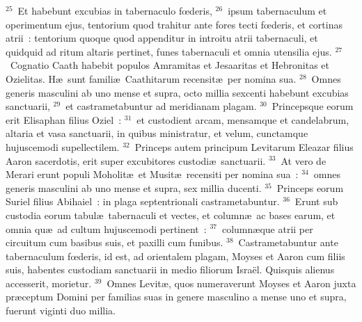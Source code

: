 ${}^{25}$~Et habebunt excubias in tabernaculo fœderis,
${}^{26}$~ipsum tabernaculum et operimentum ejus, tentorium quod trahitur ante fores tecti fœderis, et cortinas atrii~: tentorium quoque quod appenditur in introitu atrii tabernaculi, et quidquid ad ritum altaris pertinet, funes tabernaculi et omnia utensilia ejus.
${}^{27}$~Cognatio Caath habebit populos Amramitas et Jesaaritas et Hebronitas et Ozielitas. H\ae\ sunt famili\ae\ Caathitarum recensit\ae\ per nomina sua.
${}^{28}$~Omnes generis masculini ab uno mense et supra, octo millia sexcenti habebunt excubias sanctuarii,
${}^{29}$~et castrametabuntur ad meridianam plagam.
${}^{30}$~Princepsque eorum erit Elisaphan filius Oziel~:
${}^{31}$~et custodient arcam, mensamque et candelabrum, altaria et vasa sanctuarii, in quibus ministratur, et velum, cunctamque hujuscemodi supellectilem.
${}^{32}$~Princeps autem principum Levitarum Eleazar filius Aaron sacerdotis, erit super excubitores custodi\ae\ sanctuarii.
${}^{33}$~At vero de Merari erunt populi Moholit\ae\ et Musit\ae\ recensiti per nomina sua~:
${}^{34}$~omnes generis masculini ab uno mense et supra, sex millia ducenti.
${}^{35}$~Princeps eorum Suriel filius Abihaiel~: in plaga septentrionali castrametabuntur.
${}^{36}$~Erunt sub custodia eorum tabul\ae\ tabernaculi et vectes, et column\ae\ ac bases earum, et omnia qu\ae\ ad cultum hujuscemodi pertinent~:
${}^{37}$~column\ae que atrii per circuitum cum basibus suis, et paxilli cum funibus.
${}^{38}$~Castrametabuntur ante tabernaculum fœderis, id est, ad orientalem plagam, Moyses et Aaron cum filiis suis, habentes custodiam sanctuarii in medio filiorum Isra\"el. Quisquis alienus accesserit, morietur.
${}^{39}$~Omnes Levit\ae , quos numeraverunt Moyses et Aaron juxta pr\ae ceptum Domini per familias suas in genere masculino a mense uno et supra, fuerunt viginti duo millia.


